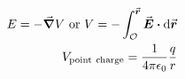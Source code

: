 

\vspace*{\fill}
\centering

\begin{align*}
    E = -\grad V ~{\rm or}~ V = -\int_{\mathcal{O}}^{\va*{r}} \va*{E} \vdot \dd{\va*{r}} \\
    V_{\rm point~charge} = \frac{1}{4 \pi \epsilon_0} \frac{q}{r}
\end{align*}

\centering
\vspace*{\fill}

